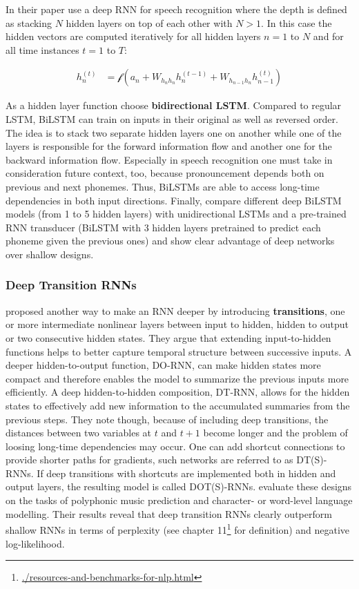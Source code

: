 \documentclass[]{krantz}
\renewcommand{\href}[2]{#2\footnote{\url{#1}}}
\begin{document}
In their paper \citet{graves2013speech} use a deep RNN for speech recognition where the depth is defined as stacking \(N\) hidden layers on top of each other with \(N>1\). In this case the hidden vectors are computed iteratively for all hidden layers \(n=1\) to \(N\) and for all time instances \(t=1\) to \(T\):

\begin{align}
h_{n}^{(t)} & = \mathcal{f}(a_{n}+W_{h_{n}h_{n}}h_{n}^{(t-1)}+W_{h_{n-1}h_{n}}h_{n-1}^{(t)}) \label{eq:deep-hidden}
\end{align}

As a hidden layer function \citet{graves2013speech} choose \textbf{bidirectional LSTM}. Compared to regular LSTM, BiLSTM can train on inputs in their original as well as reversed order. The idea is to stack two separate hidden layers one on another while one of the layers is responsible for the forward information flow and another one for the backward information flow. Especially in speech recognition one must take in consideration future context, too, because pronouncement depends both on previous and next phonemes. Thus, BiLSTMs are able to access long-time dependencies in both input directions. Finally, \citet{graves2013speech} compare different deep BiLSTM models (from 1 to 5 hidden layers) with unidirectional LSTMs and a pre-trained RNN transducer (BiLSTM with 3 hidden layers pretrained to predict each phoneme given the previous ones) and show clear advantage of deep networks over shallow designs.

\hypertarget{deep-transition-rnns}{%
\subsubsection{Deep Transition RNNs}\label{deep-transition-rnns}}

\citet{pascanu2013construct} proposed another way to make an RNN deeper by introducing \textbf{transitions}, one or more intermediate nonlinear layers between input to hidden, hidden to output or two consecutive hidden states. They argue that extending input-to-hidden functions helps to better capture temporal structure between successive inputs. A deeper hidden-to-output function, DO-RNN, can make hidden states more compact and therefore enables the model to summarize the previous inputs more efficiently. A deep hidden-to-hidden composition, DT-RNN, allows for the hidden states to effectively add new information to the accumulated summaries from the previous steps. They note though, because of including deep transitions, the distances between two variables at \(t\) and \(t+1\) become longer and the problem of loosing long-time dependencies may occur. One can add shortcut connections to provide shorter paths for gradients, such networks are referred to as DT(S)-RNNs. If deep transitions with shortcuts are implemented both in hidden and output layers, the resulting model is called DOT(S)-RNNs. \citet{pascanu2013construct} evaluate these designs on the tasks of polyphonic music prediction and character- or word-level language modelling. Their results reveal that deep transition RNNs clearly outperform shallow RNNs in terms of perplexity (see chapter \href{./resources-and-benchmarks-for-nlp.html}{11} for definition) and negative log-likelihood.
\end{document}
